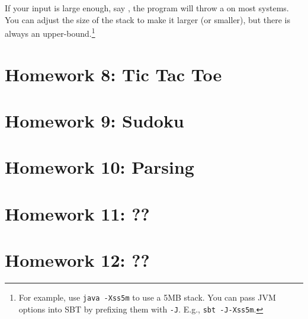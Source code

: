 \documentclass{book}
\begin{document}
If your input is large enough, say , the program
will throw a  on most systems.
You can adjust the size of the stack to make it larger (or smaller), but there
is always an upper-bound.\footnote{For example, use \texttt{java -Xss5m} to
use a 5MB stack. You can pass JVM options into SBT by prefixing them with \texttt{-J}. E.g., \texttt{sbt -J-Xss5m}.}








\newlecture

\chapter{Homework 8: Tic Tac Toe}

\newlecture


\newlecture

\newlecture


\chapter{Homework 9: Sudoku}

\newlecture

\newlecture


\chapter{Homework 10: Parsing}

\newlecture

\newlecture


\chapter{Homework 11: ??}

\newlecture

\newlecture

\chapter{Homework 12: ??}

\newlecture

\newlecture

\end{document}
